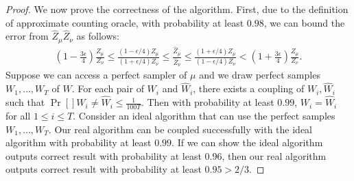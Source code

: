 \begin{proof}
We now prove the correctness of the algorithm.
First, due to the definition of approximate counting oracle, with probability at least $0.98$, we can bound the error from ${\hat{Z}_\mu}{\hat{Z}_\nu}$ as follows:
\begin{align}\label{eq:ErrorZ}
    \left(1-\frac{3\epsilon}{4}\right)\frac{Z_\mu}{Z_\nu}  \leq \frac{(1-\epsilon/4)Z_\mu}{(1+\epsilon/4)Z_\nu} \leq \frac{\hat{Z}_\mu}{\hat{Z}_\nu}\leq \frac{(1+\epsilon/4)Z_\mu}{(1-\epsilon/4)Z_\nu}<\left(1+\frac{3\epsilon}{4}\right)\frac{Z_\mu}{Z_\nu}.
\end{align}
Suppose we can access a perfect sampler of $\mu$ and we draw perfect samples $W_1,\dots,W_T$ of $W$.
For each pair of $W_i$ and $\hat{W}_i$, there exists a coupling of $W_i,\hat{W}_i$ such that $\Pr[]{W_i \neq \hat{W}_i}\leq\frac{1}{100T}$. Then with probability at least $0.99$, $W_i = \hat{W}_i$ for all $1 \leq i \leq T$.
Consider an ideal algorithm that can use the perfect samples $W_1,\dots,W_T$.
Our real algorithm can be coupled successfully with the ideal algorithm with probability at least $0.99$. If we can show the ideal algorithm outputs correct result with probability at least $0.96$, then our real algorithm outputs correct result with probability at least $0.95 > 2/3$.


\end{proof}

